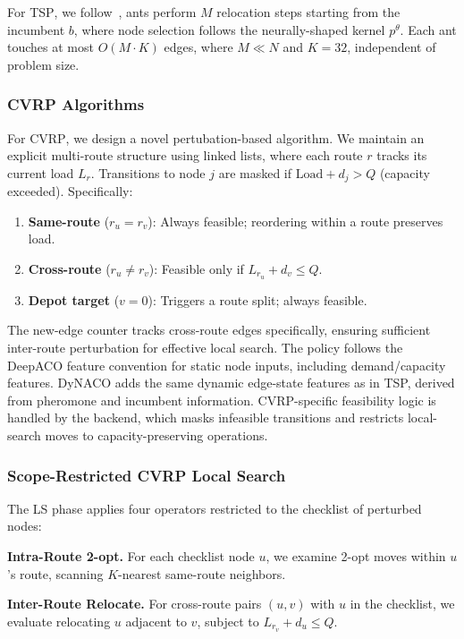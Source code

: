 \documentclass[sigconf]{acmart}
\newcommand{\TSP}{\textsc{TSP}}
\newcommand{\CVRP}{\textsc{CVRP}}
\begin{document}
For \TSP{}, we follow~\cite{faco}, ants perform $M$ relocation steps starting from the incumbent $b$, where node selection follows the neurally-shaped kernel $p^\theta$. Each ant touches at most $O(M \cdot K)$ edges, where $M \ll N$ and $K{=}32$, independent of problem size.

\subsubsection{CVRP Algorithms}
\label{app:cvrp}

For \CVRP{}, we design a novel pertubation-based algorithm. We maintain an explicit multi-route structure using linked lists, where each route $r$ tracks its current load $L_r$.
Transitions to node $j$ are masked if $\text{Load} + d_j > Q$ (capacity exceeded).
Specifically:
\begin{enumerate}
    \item \textbf{Same-route} ($r_u = r_v$): Always feasible; reordering within a route preserves load.
    \item \textbf{Cross-route} ($r_u \neq r_v$): Feasible only if $L_{r_u} + d_v \leq Q$.
    \item \textbf{Depot target} ($v = 0$): Triggers a route split; always feasible.
\end{enumerate}
The new-edge counter tracks cross-route edges specifically, ensuring sufficient inter-route perturbation for effective local search. The policy follows the DeepACO feature convention for static node inputs, including demand/capacity features. DyNACO adds the same dynamic edge-state features as in TSP, derived from pheromone and incumbent information. CVRP-specific feasibility logic is handled by the backend, which masks infeasible transitions and restricts local-search moves to capacity-preserving operations.

\subsubsection{Scope-Restricted CVRP Local Search}
The LS phase applies four operators restricted to the checklist of perturbed nodes:

\textbf{Intra-Route 2-opt.}
For each checklist node $u$, we examine 2-opt moves within $u$'s route, scanning $K$-nearest same-route neighbors.

\textbf{Inter-Route Relocate.}
For cross-route pairs $(u, v)$ with $u$ in the checklist, we evaluate relocating $u$ adjacent to $v$, subject to $L_{r_v} + d_u \leq Q$.
\end{document}
